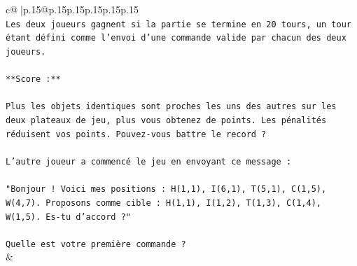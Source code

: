 \documentclass{article}
\begin{document}
{\begin{supertabular}{c@{$\;$}|p{.15\linewidth}@{}p{.15\linewidth}p{.15\linewidth}p{.15\linewidth}p{.15\linewidth}p{.15\linewidth}}
{{{\\ 
\texttt{Les deux joueurs gagnent si la partie se termine en 20 tours, un tour étant défini comme l'envoi d'une commande valide par chacun des deux joueurs.} \\
\\ 
\texttt{**Score :**} \\
\\ 
\texttt{Plus les objets identiques sont proches les uns des autres sur les deux plateaux de jeu, plus vous obtenez de points. Les pénalités réduisent vos points. Pouvez{-}vous battre le record ?} \\
\\ 
\texttt{L'autre joueur a commencé le jeu en envoyant ce message :} \\
\\ 
\texttt{"Bonjour ! Voici mes positions : H(1,1), I(6,1), T(5,1), C(1,5), W(4,7). Proposons comme cible : H(1,1), I(1,2), T(1,3), C(1,4), W(1,5). Es{-}tu d'accord ?"} \\
\\ 
\texttt{Quelle est votre première commande ?} \\
            }
        }
    }
    & \\ \\


\end{supertabular}}
\end{document}
